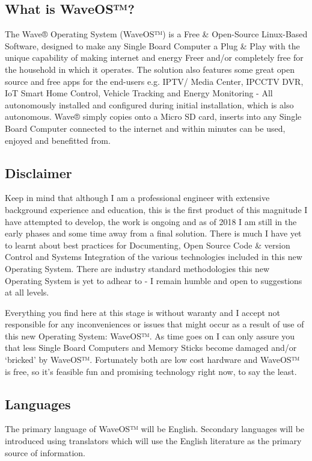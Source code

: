 \documentclass[letterpaper,10pt,english]{sphinxmanual}
\begin{document}
\subsection{What is WaveOS™?}
\label{\detokenize{end-user:what-is-waveos}}
The Wave® Operating System (WaveOS™) is a Free \& Open-Source Linux-Based Software, designed to make any Single Board Computer a Plug \& Play  with the unique capability of making internet and energy Freer and/or completely free for the household in which it operates. The solution also features some great open source and free apps for the end-users e.g. IPTV/ Media Center, IPCCTV DVR, IoT Smart Home Control, Vehicle Tracking and Energy Monitoring - All autonomously installed and configured during initial installation, which is also autonomous. Wave® simply copies onto a Micro SD card, inserts into any Single Board Computer connected to the internet and within minutes can be used, enjoyed and benefitted from.


\subsection{Disclaimer}
\label{\detokenize{end-user:disclaimer}}
Keep in mind that although I am a professional engineer with extensive background experience and education, this is the first product of this magnitude I have attempted to develop, the work is ongoing and as of 2018 I am still in the early phases and some time away from a final solution. There is much I have yet to learnt about best practices for Documenting, Open Source Code \& version Control and Systems Integration of the various technologies included in this new Operating System. There are industry standard methodologies this new Operating System is yet to adhear to - I remain humble and open to suggestions at all levels.

Everything you find here at this stage is without waranty and I accept not responsible for any inconveniences or issues that might occur as a result of use of this new Operating System: WaveOS™. As time goes on I can only assure you that less Single Board Computers and Memory Sticks become damaged and/or ‘bricked’ by WaveOS™. Fortunately both are low cost hardware and WaveOS™ is free, so it’s feasible fun and promising technology right now, to say the least.


\subsection{Languages}
\label{\detokenize{end-user:languages}}
The primary language of WaveOS™ will be English. Secondary languages will be introduced using translators which will use the English literature as the primary source of information.
\end{document}
